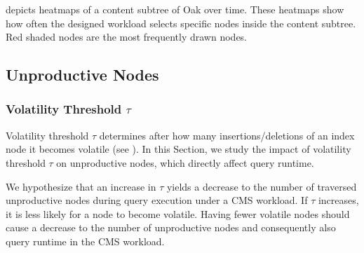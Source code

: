 \documentclass[abstracton,12pt]{scrartcl}
\theoremstyle{definition}
\begin{document}
 depicts heatmaps of a content subtree of Oak over time.
These heatmaps show how often the designed workload selects specific nodes
inside the content subtree. Red shaded nodes are the most frequently drawn nodes.





\vspace{-0.3cm}

\subsection{Unproductive Nodes}

\label{sec:unproductive-nodes-experiment}

\subsubsection{Volatility Threshold $\tau$}

\label{sec:threshold}

Volatility threshold $\tau$ determines after how many insertions/deletions of an index node
it becomes volatile (see ). In this Section, we study the impact of
volatility threshold $\tau$ on unproductive nodes, which directly affect query runtime.

We hypothesize that an increase in $\tau$ yields a decrease to the number of
traversed unproductive nodes during query execution under a CMS workload. If
$\tau$ increases, it is
less likely for a node to become volatile. Having fewer volatile nodes should
cause a decrease to the number of unproductive nodes and consequently also query
runtime in the CMS workload.
\end{document}
